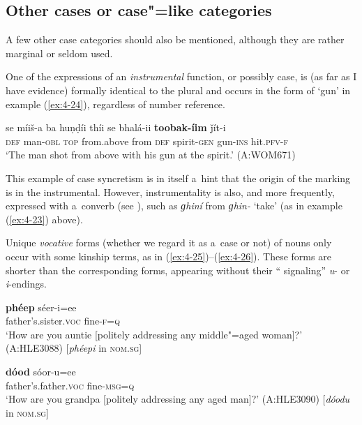\subsection{Other cases or case"=like categories}
\label{subsec:4-5-4}

A few other case categories should also be mentioned, although they are rather marginal or seldom used. 


One of the expressions of an \textit{instrumental} function, or possibly case, is (as far as I have evidence) formally identical to the  plural and occurs in the form of `gun' in example (\ref{ex:4-24}), regardless of number reference. 


\begin{exe}
\ex
\label{ex:4-24}
\gll se míiš-a ba huṇḍíi thíi se bhalá-ii \textbf{toobak-íim} ǰít-i \\
	\textsc{def} man-\textsc{obl} \textsc{top} from.above from \textsc{def} spirit-\textsc{gen} gun-\textsc{ins} hit.\textsc{pfv-f}\\
\glt `The man shot from above with his gun at the spirit.' (A:WOM671)
\end{exe}

This example of case syncretism is in itself a~hint that the origin of the  marking is in the instrumental. However, instrumentality is also, and more frequently, expressed with a~converb (see ), such as \textit{ɡhiní} from \textit{ɡhin-} `take' (as in example (\ref{ex:4-23}) above).


Unique \textit{vocative} forms (whether we regard it as a~case or not) of nouns only occur with some kinship terms, as in (\ref{ex:4-25})--(\ref{ex:4-26}). These forms are shorter than the corresponding  forms, appearing without their `` signaling'' \textit{u}- or \textit{i}-endings.


\begin{exe}
\ex
\label{ex:4-25}
\gll \textbf{phéep} séer-i=ee \\
	father's.sister.\textsc{voc} fine-\textsc{f=q} \\
\glt `How are you auntie [politely addressing any middle"=aged woman]?' \newline(A:HLE3088) [\textit{phéepi} in \textsc{nom.sg}]
\end{exe}

\begin{exe}
\ex
\label{ex:4-26}
 \gll \textbf{dóod} sóor-u=ee \\
	father's.father.\textsc{voc} fine-\textsc{msg=q} \\
\glt `How are you grandpa [politely addressing any aged man]?' (A:HLE3090) [\textit{dóodu} in \textsc{nom.sg}]
\end{exe}

